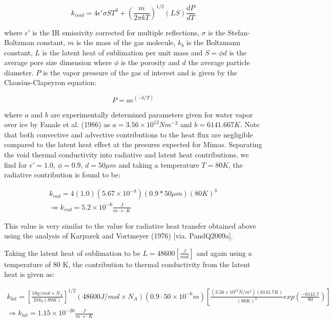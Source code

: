 \documentclass[11pt]{article} %
\begin{document}
	\begin{equation}
	k_{void} = 4 \epsilon' \sigma S T^{3} + ( \frac{m}{2 \pi k T})^{1/2}  (L S) \frac{dP}{dT}
	\end{equation}
	
	where $\epsilon'$ is the IR emissivity corrected for multiple reflections, $\sigma$ is the Stefan-Boltzman constant, $m$ is the mass of the gas molecule, $k_{b}$ is the Boltzmann constant, $L$ is the latent heat of sublimation per unit mass and $S = \phi d$ is the average pore size dimension where $\phi$ is the porosity and $d$ the average particle diameter. $P$ is the vapor pressure of the gas of interest and is given by the Clausius-Clapeyron equation:
	 
	 \begin{equation}
	 P = ae^{(-b/T)}
	 \end{equation}
	 
	 where $a$ and $b$ are experimentally determined parameters given for water vapor over ice by Fanale et al. (1986) as $a = 3.56 \times 10^{12} N m^{-2}$ and $b = 6141.667 K$. Note that both convective and advective contributions to the heat flux are negligible compared to the latent heat effect at the presures expected for Mimas. Separating the void thermal conductivity into radiative and latent heat contributions, we find for $\epsilon' = 1.0$, $\phi = 0.9$, $d = 50 \mu m$ and taking a temperature $T = 80 K$, the radiative contribution is found to be:
	 
	 \begin{equation}
	 \begin{split}
	 k_{rad} = 4(1.0)(5.67\times 10^{-8})(0.9*50 \mu m)(80K)^{3} \\
	 \Rightarrow k_{rad} = 5.2\times10^{-6} \frac{J}{m \cdot s \cdot K}
	 \end{split}
	 \end{equation}

	This value is very similar to the value for radiative heat transfer obtained above using the analysis of Karparek and Vortmeyer (1976) [via. PandQ2009a]. 
	
	Taking the latent heat of sublimation to be $L = 48600 [\frac{J}{mol}]$ and again using a temperature of 80 K, the contribution to thermal conductivity from the latent heat is given as:
	
	\begin{equation}
	\begin{split}
	k_{lat} = [ \frac{18 g/mol \times N_{A}}{2 \pi k_{b} (80K)} ]^{1/2} (48600 J/mol \times N_{A})(0.9 \cdot 50\times10^{-6} m) [ \frac{(3.56\times 10^{12} N/m^{2})(6141.7 K)}{(80 K)^{2}} exp( \frac{-6141.7}{80} ) ] \\
	\Rightarrow k_{lat} = 1.15\times10^{-26}\frac{J}{m \cdot s \cdot K}
	\end{split}
	\end{equation}
	
\end{document}
